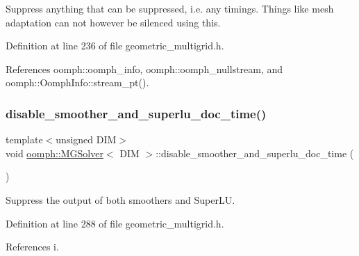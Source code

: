 Suppress anything that can be suppressed, i.\+e. any timings. Things like mesh adaptation can not however be silenced using this. 



Definition at line 236 of file geometric\+\_\+multigrid.\+h.



References oomph\+::oomph\+\_\+info, oomph\+::oomph\+\_\+nullstream, and oomph\+::\+Oomph\+Info\+::stream\+\_\+pt().

\mbox{\label{classoomph_1_1MGSolver_a84a562088ef3ec0514027cac6a69d5a9}} 
\subsubsection{\texorpdfstring{disable\+\_\+smoother\+\_\+and\+\_\+superlu\+\_\+doc\+\_\+time()}{disable\_smoother\_and\_superlu\_doc\_time()}}
{\footnotesize\ttfamily template$<$unsigned D\+IM$>$ \\
void \hyperlink{classoomph_1_1MGSolver}{oomph\+::\+M\+G\+Solver}$<$ D\+IM $>$\+::disable\+\_\+smoother\+\_\+and\+\_\+superlu\+\_\+doc\+\_\+time (\begin{DoxyParamCaption}{ }\end{DoxyParamCaption})\hspace{0.3cm}{\ttfamily [inline]}}



Suppress the output of both smoothers and Super\+LU. 



Definition at line 288 of file geometric\+\_\+multigrid.\+h.



References i.

\mbox{\label{classoomph_1_1MGSolver_aa96a2b512287d603f3be8fb1c693e05a}} 
